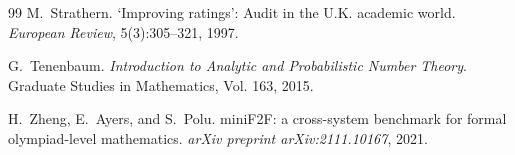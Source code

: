 \documentclass[11pt,a4paper]{article}
\theoremstyle{definition}
\theoremstyle{remark}
\begin{document}
\begin{thebibliography}{99}
M.~Strathern.
\newblock `Improving ratings': Audit in the {U.K.} academic world.
\newblock \emph{European Review}, 5(3):305--321, 1997.

G.~Tenenbaum.
\newblock \emph{Introduction to Analytic and Probabilistic Number Theory}.
\newblock Graduate Studies in Mathematics, Vol. 163, 2015.

H.~Zheng, E.~Ayers, and S.~Polu.
\newblock mini{F2F}: a cross-system benchmark for formal olympiad-level mathematics.
\newblock \emph{arXiv preprint arXiv:2111.10167}, 2021.

\end{thebibliography}
\end{document}
